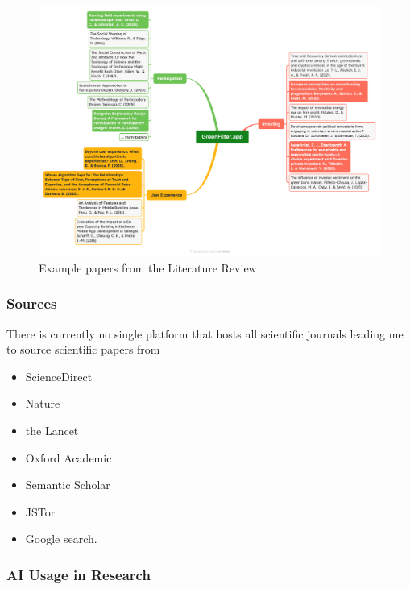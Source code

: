 \documentclass[
  letterpaper,
  DIV=11,
  numbers=noendperiod]{scrartcl}
\providecommand{\tightlist}{%
  \setlength{\itemsep}{0pt}\setlength{\parskip}{0pt}}\usepackage{longtable,booktabs,array}
\begin{document}
\begin{figure}[H]

{\centering \includegraphics[width=1\textwidth,height=\textheight]{./images/literature/literature.png}

}

\caption{Example papers from the Literature Review}

\end{figure}%

\subsubsection{Sources}\label{sources}

There is currently no single platform that hosts all scientific journals
leading me to source scientific papers from

\begin{itemize}
\tightlist
\item
  ScienceDirect
\item
  Nature
\item
  the Lancet
\item
  Oxford Academic
\item
  Semantic Scholar
\item
  JSTor
\item
  Google search.
\end{itemize}

\subsubsection{AI Usage in Research}\label{ai-usage-in-research}
\end{document}
